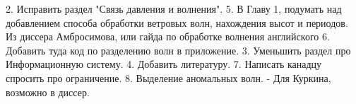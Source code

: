 
2. Исправить раздел "Связь давления и волнения".
5. В Главу 1, подумать над добавлением способа обработки ветровых волн, нахождения высот и периодов. Из диссера Амбросимова, или гайда по обработке волнения английского
6. Добавить туда код по разделению волн в приложение.
3. Уменьшить раздел про Информационную систему.
4. Добавить литературу.
7. Написать канадцу спросить про ограничение.
8. Выделение аномальных волн. - Для Куркина, возможно в диссер.

